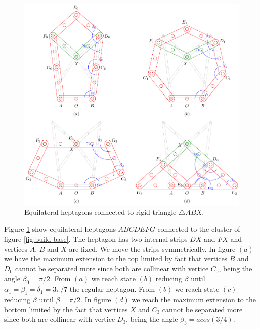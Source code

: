 \documentclass[11pt]{article}
\begin{document}
\begin{figure}[h]
\centering
\includegraphics[scale=0.9]{builder/hepta-0}
\caption{Equilateral heptagons connected to rigid triangle $\triangle{ABX}$.}
\label{fig:build}
\end{figure}

Figure \ref{fig:build} show equilateral heptagons $ABCDEFG$ connected to the cluster of figure \ref{fig:build-base}. The heptagon has two internal strips $\overline{DX}$ and $\overline{FX}$ and vertices $A$, $B$ and $X$ are fixed. We move the strips symmetrically. In figure $(a)$ we have the maximum extension to the top limited by fact that vertices $B$ and $D_0$ cannot be separated more since both are collinear with vertice $C_0$, being the angle $\beta_0 = \pi/2$. From $(a)$ we reach state $(b)$ reducing $\beta$ until $\alpha_1 = \beta_1 = \delta_1 = 3\pi/7$ the regular heptagon. From $(b)$ we reach state $(c)$ reducing $\beta$ until $\beta= \pi/2$. In figure $(d)$ we reach the maximum extension to the bottom limited by the fact that vertices $X$ and $C_3$ cannot be separated more since both are collinear with vertice $D_3$, being the angle $\beta_3 = acos(3/4)$.
\end{document}
